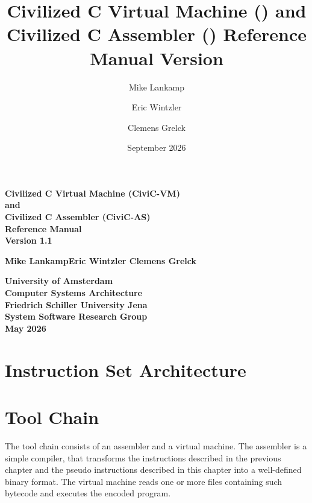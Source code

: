 \documentclass[
	a4paper,
	12pt,
	twoside,
	numbers=noenddot,
	parskip=half-,
	chapterprefix=true
]{scrreport}
\title{ Civilized C Virtual Machine (\civicvm) and Civilized C Assembler (\civicas) Reference Manual Version \manversion}
\author{Mike Lankamp \and Eric Wintzler \and Clemens Grelck}
\date{September 2026}
\newcommand{\civicvm}{CiviC-VM}
\newcommand{\civicas}{CiviC-AS}
\newcommand{\manversion}{1.1}
\begin{document}
\thispagestyle{empty}


\begin{center}
\vspace*{2cm}
{\sffamily\bfseries\LARGE Civilized C Virtual Machine (\civicvm)\\
and\\
Civilized C Assembler (\civicas)\\[2ex]
Reference Manual\\[1ex]
Version \manversion}

\vspace*{2cm}
{\sffamily\bfseries\Large Mike Lankamp\qquad Eric Wintzler \quad Clemens Grelck}

\vspace*{2cm}
{\sffamily\bfseries\large University of Amsterdam\\
Computer Systems Architecture\\[2ex]
Friedrich Schiller University Jena\\
System Software Research Group\\
\vspace*{1cm}
May 2026}

\end{center}

\newpage
\phantom{z}
\thispagestyle{empty}

\newpage
\tableofcontents
\newpage
\phantom{z}
\thispagestyle{empty}

\cleardoublepage

\chapter{Instruction Set Architecture}
\label{part:isa}


\cleardoublepage
\chapter{Tool Chain}
\label{part:toolchain}

The tool chain consists of an assembler and a virtual machine. The assembler is a simple compiler, that transforms the instructions described in the previous chapter and the pseudo instructions described in this chapter into a well-defined binary format. The virtual machine reads one or more files containing such bytecode and executes the encoded program.





\cleardoublepage
\appendix

\cleardoublepage

\end{document}
